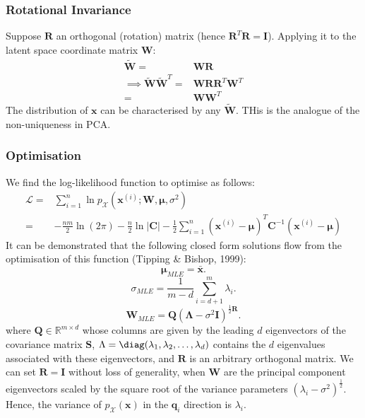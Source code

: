 \subsubsection{Rotational Invariance}
Suppose $\mathbf{R}$ an orthogonal (rotation) matrix (hence $\mathbf{R}^{T}\mathbf{R}=\mathbf{I}$).
Applying it to the latent space coordinate matrix $\mathbf{W}$:
\begin{align*}
  \mathbf{\tilde{W}}=&\mathbf{WR}\\
  \implies\mathbf{\tilde{W}\tilde{W}}^{T}=&\mathbf{WRR}^{T}\mathbf{W}^{T}\\
  =&\mathbf{WW}^{T}
\end{align*}
The distribution of $\mathbf{x}$ can be characterised by any
$\mathbf{\tilde{W}}$. THis is the analogue of the non-uniqueness in PCA.\@
\subsubsection{Optimisation}
We find the log-likelihood function to optimise as follows:
\begin{align*}
  \mathcal{L}=&\sum_{i=1}^{n} \ln p_\mathcal{X}\left( \mathbf{x}^{(i)};\mathbf{W,\mu},\sigma^{2} \right) \\
  =&-\frac{nm}{2}\ln\left( 2\pi \right) -\frac{n}{2}\ln\left| \mathbf{C} \right| -\frac{1}{2}\sum_{i=1}^{n} {\left( \mathbf{x}^{(i)}-\mathbf{\mu} \right)}^{T}\mathbf{C}^{-1}\left( \mathbf{x}^{(i)}-\mathbf{\mu} \right) 
\end{align*}
It can be demonstrated that the following closed form solutions flow from the optimisation of this
function (Tipping \& Bishop, 1999):
\[\mathbf{\mu}_{MLE}=\mathbf{\bar{x}}.\]
\[\sigma_{MLE}=\frac{1}{m-d}\sum_{i=d+1}^{m} \lambda_i.\] 
\[\mathbf{W}_{MLE}=\mathbf{Q}{\left( \mathbf{\Lambda}-\sigma^{2}\mathbf{I} \right)}^{\frac{1}{2}\mathbf{R}}.\] 
where $\mathbf{Q}\in \mathbb{R}^{m\times d}$ whose columns are given by the
leading $d$ eigenvectors of the covariance matrix $\mathbf{S}$,
$\Lambda=\diag(\lambda_1,\lambda_2,\ldots,\lambda_d)$ contains the $d$
eigenvalues associated with these eigenvectors, and $\mathbf{R}$ is an
arbitrary orthogonal matrix. We can set $\mathbf{R=I}$ without loss of
generality, when $\mathbf{W}$ are the principal component eigenvectors scaled
by the square root of the variance parameters ${(\lambda_i-\sigma^{2})}^{\frac{1}{2}}$.
Hence, the variance of $p_\mathcal{X}(\mathbf{x})$ in the $\mathbf{q}_i$
direction is $\lambda_i$.

